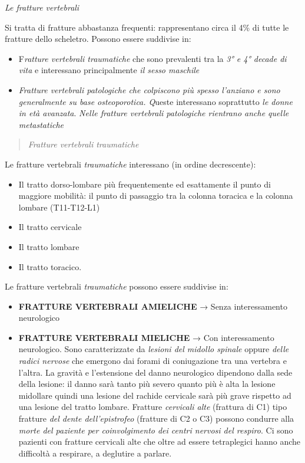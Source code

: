 \documentclass[]{article}
\date{}
\begin{document}
\emph{Le fratture vertebrali}

Si tratta di fratture abbastanza frequenti: rappresentano circa il 4\%
di tutte le fratture dello scheletro. Possono essere suddivise in:

\begin{itemize}
\item
  F\emph{ratture vertebrali traumatiche} che sono prevalenti tra la
  \emph{3° e 4° decade di vita} e interessano principalmente \emph{il
  sesso maschile}
\item
  \emph{\emph{Fratture vertebrali patologiche che colpiscono più spesso
  l'anziano e sono generalmente su base osteoporotica. Q}}ueste
  interessano soprattutto \emph{le donne in età avanzata}. \emph{Nelle
  fratture vertebrali patologiche rientrano anche quelle metastatiche}
\end{itemize}

\begin{quote}
\emph{Fratture vertebrali traumatiche}
\end{quote}

Le fratture vertebrali \emph{traumatiche} interessano (in ordine
decrescente):

\begin{itemize}
\item
  Il tratto dorso-lombare più frequentemente ed esattamente il punto di
  maggiore mobilità: il punto di passaggio tra la colonna toracica e la
  colonna lombare (T11-T12-L1)
\item
  Il tratto cervicale
\item
  Il tratto lombare
\item
  Il tratto toracico.
\end{itemize}

Le fratture vertebrali \emph{traumatiche} possono essere suddivise in:

\begin{itemize}
\item
  \textbf{FRATTURE VERTEBRALI AMIELICHE} → Senza interessamento
  neurologico
\item
  \textbf{FRATTURE VERTEBRALI MIELICHE} → Con interessamento
  neurologico. Sono caratterizzate da \emph{lesioni del midollo spinale}
  oppure \emph{delle radici nervose} che emergono dai forami di
  coniugazione tra una vertebra e l'altra. La gravità e l'estensione del
  danno neurologico dipendono dalla sede della lesione: il danno sarà
  tanto più severo quanto più è alta la lesione midollare quindi una
  lesione del rachide cervicale sarà più grave rispetto ad una lesione
  del tratto lombare. Fratture \emph{cervicali alte} (frattura di C1)
  tipo fratture \emph{del dente dell'epistrofeo} (fratture di C2 o C3)
  possono condurre alla \emph{morte del paziente per coinvolgimento dei
  centri nervosi del respiro}. Ci sono pazienti con fratture cervicali
  alte che oltre ad essere tetraplegici hanno anche difficoltà a
  respirare, a deglutire a parlare.
\end{itemize}
\end{document}
